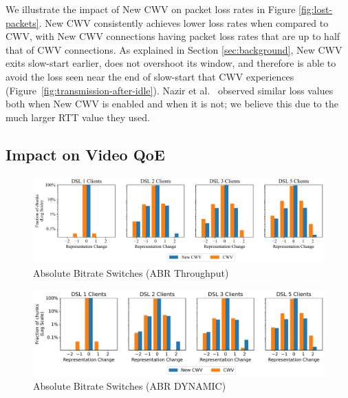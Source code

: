 \documentclass[10pt,sigconf]{acmart}
\begin{document}
We illustrate the impact of New CWV on packet loss rates in Figure \ref{fig:lost-packets}. New CWV consistently achieves lower loss rates when compared to CWV, with New CWV connections having packet loss rates that are up to half that of CWV connections. As explained in Section \ref{sec:background}, New CWV exits slow-start earlier, does not overshoot its window, and therefore is able to avoid the loss seen near the end of slow-start that CWV experiences (Figure~\ref{fig:transmission-after-idle}). Nazir et al.~\cite{Nazir-2014-performance-evaluation-congestion-window-validation-dash-newcwv} observed similar loss values both when New CWV is enabled and when it is not; we believe this due to the much larger RTT value they used.


\subsection{Impact on Video QoE}
\label{sec:QoE-impact}

\begin{figure}
  \centering
  \includegraphics[width=\textwidth, keepaspectratio]{figures/bitrate_derivative_distribution.pdf}
  \caption{Absolute Bitrate Switches (ABR Throughput)}
  \label{fig:bitrate-switches}
\end{figure}

\begin{figure}
  \centering
  \includegraphics[width=\textwidth, keepaspectratio]{figures/bitrate_derivative_distribution_dynamic.pdf}
  \caption{Absolute Bitrate Switches (ABR DYNAMIC)}
  \label{fig:bitrate-switches-dynamic}
\end{figure}
\end{document}
